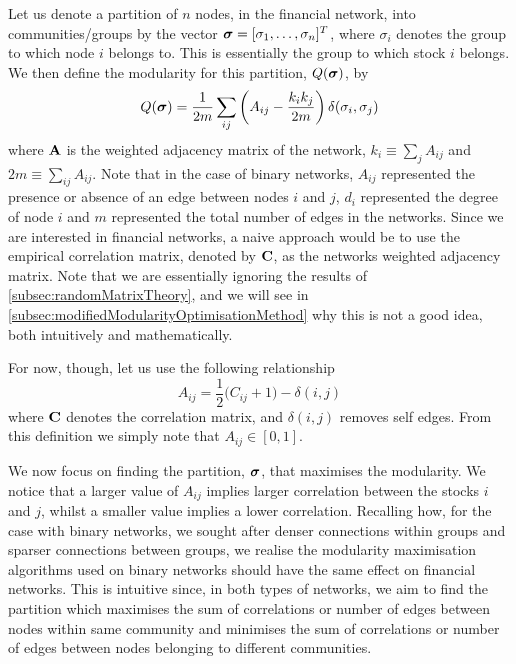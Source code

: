 Let us denote a partition of $n$ nodes, in the financial network, into communities/groups by the vector $\vecvar{\sigma} = \transpose{[\sigma_{1},\dots,\sigma_{n}]}$, where $\sigma_{i}$ denotes the group to which node $i$ belongs to. This is essentially the group to which stock $i$ belongs. We then define the modularity for this partition, $Q(\vecvar{\sigma})$, by
\begin{equation}
\label{eq:modularityFinancialNetworks}
	Q(\vecvar{\sigma}) = \frac{1}{2m} \sum_{ij} \left(A_{ij} - \frac{k_{i}k_{j}}{2m} \right) \delta(\sigma_{i},\sigma_{j})
\end{equation}
where $\mathbf A$ is the weighted adjacency matrix of the network, $k_{i} \equiv \sum_{j} A_{ij}$ and $2m \equiv \sum_{ij} A_{ij}$.
Note that in the case of binary networks, $A_{ij}$ represented the presence or absence of an edge between nodes $i$ and $j$, $d_{i}$ represented the degree of node $i$ and $m$ represented the total number of edges in the networks.
Since we are interested in financial networks, a naive approach would be to use the empirical correlation matrix, denoted by $\mathbf C$, as the networks weighted adjacency matrix. Note that we are essentially ignoring the results of \cref{subsec:randomMatrixTheory}, and we will see in \cref{subsec:modifiedModularityOptimisationMethod} why this is not a good idea, both intuitively and mathematically.

For now, though, let us use the following relationship
\begin{equation}
\label{eq:weightedAdjacencyMatrixFinancialNetworks}
	A_{ij} = \frac{1}{2} \big( C_{ij}+1 \big) - \delta(i,j)
\end{equation}
where $\mathbf C$ denotes the correlation matrix, and $\delta(i,j)$ removes self edges. From this definition we simply note that $A_{ij} \in [0,1]$.

We now focus on finding the partition, $\vecvar{\sigma}$, that maximises the modularity. We notice that a larger value of $A_{ij}$ implies larger correlation between the stocks $i$ and $j$, whilst a smaller value implies a lower correlation.
 Recalling how, for the case with binary networks, we sought after denser connections within groups and sparser connections between groups, we realise the modularity maximisation algorithms used on binary networks should have the same effect on financial networks.
This is intuitive since, in both types of networks, we aim to find the partition which maximises the sum of correlations or number of edges between nodes within same community and minimises the sum of correlations or number of edges between nodes belonging to different communities.

